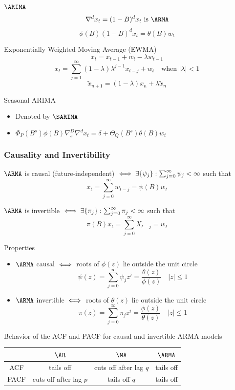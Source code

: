 \documentclass[landscape]{article}
\begin{document}
\begin{multicols*}{2}
$\ARIMA$
$$\nabla^d x_t = (1-B)^d x_t \text{ is } \ARMA$$
$$\phi(B)(1-B)^d x_t = \theta(B) w_t$$

Exponentially Weighted Moving Average (EWMA)
$$x_t = x_{t-1} + w_t - \lambda w_{t-1}$$
$$x_t = \sum_{j=1}^\infty(1-\lambda)\lambda^{j-1} x_{t-j} + w_t 
\quad\text{when } |\lambda| < 1$$
$$\tilde{x}_{n+1} = (1-\lambda)x_n + \lambda \tilde{x}_n$$

\columnbreak

Seasonal ARIMA
\begin{itemize}
  \item Denoted by $\SARIMA$
  \item $\Phi_P(B^s) \phi(B) \nabla_s^D \nabla^d x_t 
    = \delta + \Theta_Q(B^s)\theta(B)w_t$
\end{itemize}

\subsubsection{Causality and Invertibility}
$\ARMA$ is causal (future-independent) 
$\;\Longleftrightarrow\; \exists \{\psi_j\} : \sum_{j=0}^\infty \psi_j < \infty$ such that
$$x_t = \sum_{j=0}^\infty w_{t-j} = \psi(B)w_t$$

$\ARMA$ is invertible
$\;\Longleftrightarrow\; \exists \{\pi_j\} : \sum_{j=0}^\infty \pi_j < \infty$ such that
$$\pi(B)x_t = \sum_{j=0}^\infty X_{t-j} = w_t$$

Properties
\begin{itemize}
  \item $\ARMA$ causal $\;\Longleftrightarrow\;$ roots of $\phi(z)$ lie outside the unit circle
    $$\psi(z) = \sum_{j=0}^\infty\psi_j z^j = \frac{\theta(z)}{\phi(z)} 
    \quad |z| \le 1$$
  \item $\ARMA$ invertible $\;\Longleftrightarrow\;$ roots of $\theta(z)$ lie outside the unit
    circle
    $$\pi(z) = \sum_{j=0}^\infty\pi_j z^j = \frac{\phi(z)}{\theta(z)} 
    \quad |z| \le 1$$
\end{itemize}

Behavior of the ACF and PACF for causal and invertible ARMA models

\begin{center}
  \begin{tabular}{|c|ccc|}
    \hline
    & $\AR$ & $\MA$ & $\ARMA$\\
    \hline
    ACF & tails off & cuts off after lag $q$ & tails off \\
    PACF & cuts off after lag $p$ & tails off $q$ & tails off \\
    \hline
  \end{tabular}
\end{center}


\end{multicols*}
\end{document}
